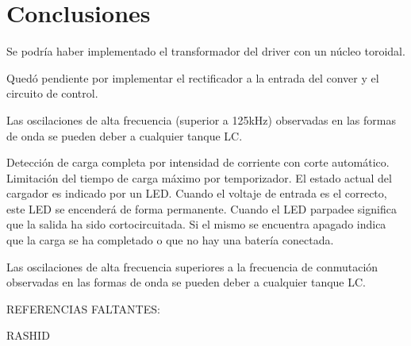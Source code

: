\section{Conclusiones}



Se podría haber implementado el transformador del driver con un núcleo toroidal. 

Quedó pendiente por implementar el rectificador a la entrada del conver y el circuito de control.

Las oscilaciones de alta frecuencia (superior a 125kHz) observadas en las formas de onda se pueden deber a cualquier tanque LC. 

Detección de carga completa por intensidad de corriente con corte automático. Limitación del tiempo de carga máximo por temporizador. El estado actual del cargador es indicado por un LED. Cuando el voltaje de entrada es el correcto, este LED se encenderá de forma permanente. Cuando el LED parpadee significa que la salida ha sido cortocircuitada. Si el mismo se encuentra apagado indica que la carga se ha completado o que no hay una batería conectada.

Las oscilaciones de alta frecuencia superiores a la frecuencia de conmutación observadas en las formas de onda se pueden deber a cualquier tanque LC. 

REFERENCIAS FALTANTES: 

RASHID 